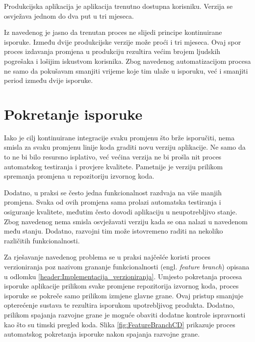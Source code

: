 \documentclass[times, utf8, diplomski, numeric]{fer}
\newcommand{\eng}[1]{(engl. \textit{#1})}
\begin{document}
Produkcijska aplikacija je aplikacija trenutno dostupna korisniku. Verzija se osvježava jednom do dva put u tri mjeseca.

Iz navedenog je jasno da trenutan proces ne slijedi principe kontinuirane isporuke. Između dvije produkcijske verzije može proći i tri mjeseca. Ovaj spor proces izdavanja promjena u produkciju rezultira većim brojem ljudskih pogrešaka i lošijim iskustvom korisnika. Zbog navedenog automatizacijom procesa ne samo da pokušavam smanjiti vrijeme koje tim ulaže u isporuku, već i smanjiti period između dvije isporuke.


\section{Pokretanje isporuke}

Iako je cilj kontinuirane integracije svaku promjenu što brže isporučiti, nema smisla za svaku promjenu linije koda graditi novu verziju aplikacije. Ne samo da to ne bi bilo resursno isplativo, već većina verzija ne bi prošla nit proces automatskog testiranja i provjere kvalitete. Pametnije je verziju prilikom spremanja promjena u repozitoriju izvornog koda.

Dodatno, u praksi se često jedna funkcionalnost razdvaja na više manjih promjena. Svaka od ovih promjena sama prolazi automatska testiranja i osiguranje kvalitete, međutim često dovodi aplikaciju u neupotrebljivo stanje. Zbog navedenog nema smisla osvježavati verziju kada se ona nalazi u navedenom među stanju. Dodatno, razvojni tim može istovremeno raditi na nekoliko različitih funkcionalnosti.

Za rješavanje navedenog problema se u praksi najčešće koristi proces verzioniranja poz nazivom grananje funkcionalnosti \eng{feature branch} opisana u odlomku \ref{header:Implementacija_verzioniranja}. Umjesto pokretanja procesa isporuke aplikacije prilikom svake promjene repozitorija izvornog koda, proces isporuke se pokreče samo prilikom izmjene glavne grane. Ovaj pristup smanjuje opterećenje sustava te rezultira isporukom upotrebljivog produkta. Dodatno, prilikom spajanja razvojne grane je moguće obaviti dodatne kontrole ispravnosti kao što su timski pregled koda. Slika \ref{fig:FeatureBranchCD} prikazuje proces automatskog pokretanja isporuke nakon spajanja razvojne grane.
\end{document}
